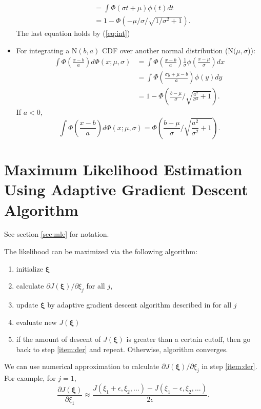 \documentclass[12pt]{article}
\begin{document}
\begin{itemize}
\begin{align*}
    & = \int \Phi(\sigma t + \mu)\phi(t) dt \\
    & = 1 - \Phi(-\mu/\sigma/\sqrt{1/\sigma^2+1}).
  \end{align*}
  The last equation holds by (\ref{eq:int})
\item For integrating a $\textrm{N}(b, a)$ CDF over another normal
  distribution ($\textrm{N}(\mu, \sigma$)):
  \begin{align}
    \int \Phi \left( \frac{x-b}{a} \right) d\Phi(x; \mu, \sigma) & = \int \Phi \left( \frac{x-b}{a} \right) \frac{1}{\sigma} \phi \left( \frac{x-\mu}{\sigma} \right) dx \nonumber\\
    &= \int \Phi \left( \frac{\sigma y + \mu - b}{a}  \right) \phi(y) dy \nonumber \\
    \label{eq:intg1}
    & = 1- \Phi \left( \frac{b-\mu}{\sigma} /
      \sqrt{\frac{a^2}{\sigma^2}+1} \right).
  \end{align}
  If $a < 0$,
  \begin{equation}
    \label{eq:intg2}
    \int \Phi \left( \frac{x-b}{a} \right) d\Phi(x; \mu, \sigma) = \Phi \left( \frac{b-\mu}{\sigma} / \sqrt{\frac{a^2}{\sigma^2}+1} \right).
  \end{equation}

\end{itemize}

\section{Maximum Likelihood Estimation Using Adaptive Gradient Descent
  Algorithm}
\label{sec:agda}

See section \ref{sec:mle} for notation.

The likelihood can be maximized via the following algorithm:
\begin{enumerate}
\item initialize $\bm \xi$
\item \label{item:der} calculate $\partial J(\bm \xi) / \partial
  \xi_j$ for all $j$,
\item update $\bm \xi$ by adaptive gradient descent algorithm
  described in \citep{ried1993} for all $j$
\item evaluate new $J(\bm \xi)$
\item if the amount of descent of $J ( \bm \xi)$ is greater than a
  certain cutoff, then go back to step \ref{item:der} and
  repeat. Otherwise, algorithm converges.
\end{enumerate}

We can use numerical approximation to calculate $\partial J(\bm
\xi)/\partial \xi_j$ in step \ref{item:der}. For example, for $j = 1$,
\begin{displaymath}
  \frac{\partial J(\bm \xi)}{\partial \xi_1} \approx \frac{J(\xi_1 + \epsilon, \xi_2, \ldots) - J(\xi_1 - \epsilon, \xi_2, \ldots)}{2\epsilon}.
\end{displaymath}
\end{document}
